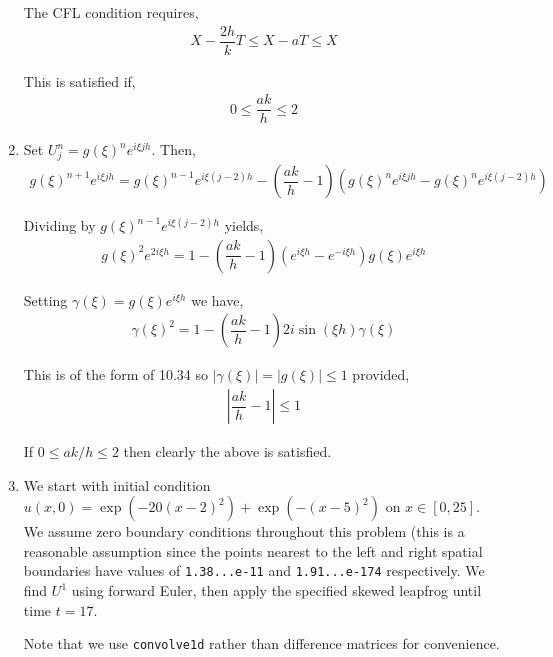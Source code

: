 \documentclass[10pt]{article}
\begin{document}
\begin{solution}[Solution]
\begin{enumerate}[label=(\alph*)]
    The CFL condition requires,
    \begin{align*}
        X - \dfrac{2h}{k}T \leq X-aT \leq X
    \end{align*}

    This is satisfied if,
    \begin{align*}
        0 \leq \dfrac{ak}{h} \leq  2
    \end{align*}

    \item Set \( U_j^n  = g(\xi)^ne^{i\xi jh} \). Then,
    \begin{align*}
        g(\xi)^{n+1}e^{i\xi j h} = g(\xi)^{n-1} e^{i\xi (j-2) h} - \left( \dfrac{ak}{h} -1 \right) \left( g(\xi)^n e^{i\xi jh} - g(\xi)^n e^{i\xi (j-2) h} \right)
    \end{align*}

    Dividing by \( g(\xi)^{n-1}e^{i\xi (j-2) h} \) yields,
    \begin{align*}
        g(\xi)^2e^{2i\xi h} = 1 - \left( \dfrac{ak}{h} -1 \right)  \left( e^{i\xi h}-e^{-i\xi h} \right) g(\xi)e^{i\xi h}
    \end{align*}

    Setting \( \gamma(\xi) = g(\xi)e^{i\xi h} \) we have,
    \begin{align*}
        \gamma(\xi)^2 = 1 - \left( \dfrac{ak}{h} -1 \right) 2i \sin(\xi h) \gamma(\xi)
    \end{align*}

    This is of the form of 10.34 so \( |\gamma(\xi)| = |g(\xi)| \leq 1 \) provided,
    \begin{align*}
        \left| \dfrac{ak}{h} -1  \right|
        \leq 1
    \end{align*}

    If \( 0\leq ak/h \leq 2 \) then clearly the above is satisfied.


    \item
    We start with initial condition \( u(x,0) = \exp\left(-20(x-2)^2\right) + \exp\left(-(x-5)^2\right) \) on \( x\in[0,25] \).
    We assume zero boundary conditions throughout this problem (this is a reasonable assumption since the points nearest to the left and right spatial boundaries have values of {\tt 1.38...e-11} and {\tt 1.91...e-174} respectively.
    We find \( U^1 \) using forward Euler, then apply the specified skewed leapfrog until time \( t=17 \).

    Note that we use {\tt convolve1d} rather than difference matrices for convenience.
    


\end{enumerate}
\end{solution}
\end{document}
